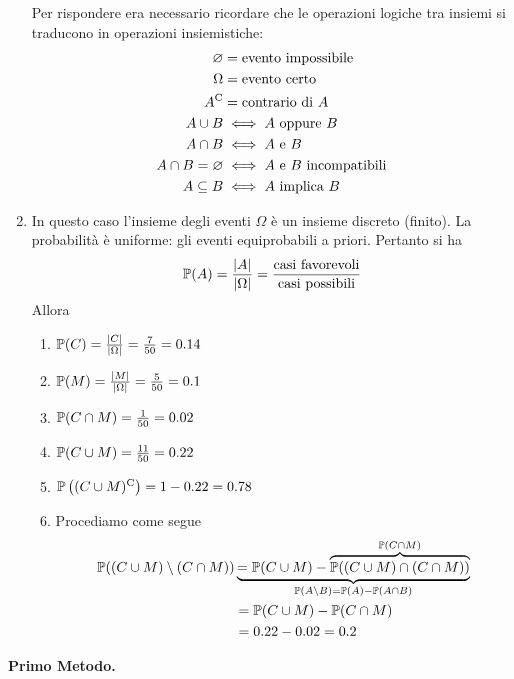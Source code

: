 \begin{enumerate}
	Per rispondere era necessario ricordare che le operazioni logiche tra insiemi si traducono in operazioni insiemistiche:
	\begin{align*}
		\emptyset  & =\text{evento impossibile}\\
		\Omega  & =\text{evento certo}\\
		A\complementary & =\text{contrario di} \ A\\
		A\cup B & \iff A\ \text{oppure} \ B\\
		A\cap B & \iff A\ \text{e} \ B\\
		A\cap B=\emptyset  & \iff A\ \text{e} \ B\ \text{incompatibili}\\
		A\subseteq B & \iff A\ \text{implica} \ B
	\end{align*}
	\item In questo caso l'insieme degli eventi $\Omega $ è un insieme discreto (finito). La probabilità è uniforme: gli eventi equiprobabili a priori. Pertanto si ha
	\begin{equation*}
		\mathbb{P}(A) =\frac{| A| }{|\Omega| } =\frac{\text{casi favorevoli}}{\text{casi possibili}}
	\end{equation*}
	Allora
	\begin{enumerate}
		\item $\mathbb{P}(C) =\frac{| C| }{| \Omega | } =\frac{7}{50} =0.14$
		\item $\mathbb{P}(M) =\frac{| M| }{| \Omega | } =\frac{5}{50} =0.1$
		\item $\mathbb{P}(C\cap M) =\frac{1}{50} =0.02$
		\item $\mathbb{P}(C\cup M) =\frac{11}{50} =0.22$
		\item $\mathbb{P}\left((C\cup M)^{\mathrm{C}}\right) =1-0.22=0.78$
		\item Procediamo come segue
		\begin{align*}
			\mathbb{P}((C\cup M) \setminus (C\cap M)) & \underbrace{=\mathbb{P}(C\cup M) -\overbrace{\mathbb{P}((C\cup M) \cap (C\cap M))}^{\mathbb{P}(C\cap M)}}_{\mathbb{P}(A\setminus B) =\mathbb{P}(A) -\mathbb{P}(A\cap B)}\\
			 & =\mathbb{P}(C\cup M) -\mathbb{P}(C\cap M)\\
			 & =0.22-0.02=0.2
		\end{align*}
	\end{enumerate}
\end{enumerate}

\Soluzione

\textbf{Primo Metodo.}

